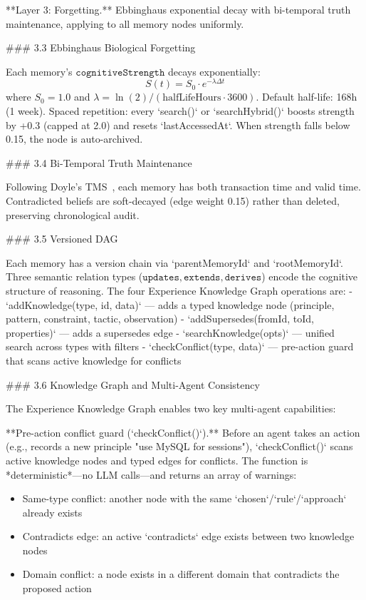 **Layer 3: Forgetting.** Ebbinghaus exponential decay with bi-temporal truth maintenance, applying to all memory nodes uniformly.

### 3.3 Ebbinghaus Biological Forgetting

Each memory's $\texttt{cognitiveStrength}$ decays exponentially:
\begin{equation}
S(t) = S_0 \cdot e^{-\lambda \Delta t}
\end{equation}
where $S_0 = 1.0$ and $\lambda = \ln(2) / (\text{halfLifeHours} \cdot 3600)$. Default half-life: 168h (1 week). Spaced repetition: every `search()` or `searchHybrid()` boosts strength by +0.3 (capped at 2.0) and resets `lastAccessedAt`. When strength falls below 0.15, the node is auto-archived.

### 3.4 Bi-Temporal Truth Maintenance

Following Doyle's TMS~\citep{doyle1979}, each memory has both transaction time and valid time. Contradicted beliefs are soft-decayed (edge weight 0.15) rather than deleted, preserving chronological audit.

### 3.5 Versioned DAG

Each memory has a version chain via `parentMemoryId` and `rootMemoryId`. Three semantic relation types ($\texttt{updates}, \texttt{extends}, \texttt{derives}$) encode the cognitive structure of reasoning. The four Experience Knowledge Graph operations are:
- `addKnowledge(type, id, data)` — adds a typed knowledge node (principle, pattern, constraint, tactic, observation)
- `addSupersedes(fromId, toId, properties)` — adds a supersedes edge
- `searchKnowledge(opts)` — unified search across types with filters
- `checkConflict({type, data})` — pre-action guard that scans active knowledge for conflicts

### 3.6 Knowledge Graph and Multi-Agent Consistency

The Experience Knowledge Graph enables two key multi-agent capabilities:

**Pre-action conflict guard (`checkConflict()`).** Before an agent takes an action (e.g., records a new principle "use MySQL for sessions"), `checkConflict()` scans active knowledge nodes and typed edges for conflicts. The function is *deterministic*—no LLM calls—and returns an array of warnings:
\begin{itemize}
\item Same-type conflict: another node with the same `chosen`/`rule`/`approach` already exists
\item Contradicts edge: an active `contradicts` edge exists between two knowledge nodes
\item Domain conflict: a node exists in a different domain that contradicts the proposed action
\end{itemize}

